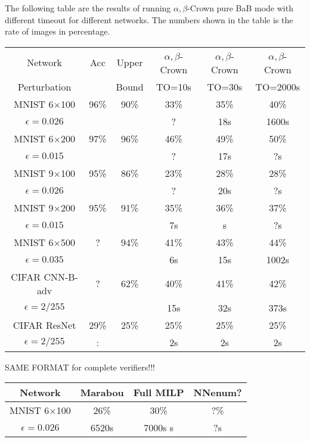 \documentclass{article} %
\theoremstyle{definition}
\begin{document}
The following table are the results of running $\alpha,\beta$-Crown pure BaB mode with different timeout for different networks. The numbers shown in the table is the rate of images in percentage.

\begin{tabular}{||c|c|c||c|c|c||}
	\hline \hline
	Network & Acc & Upper  & $\alpha,\beta$-Crown& $\alpha,\beta$-Crown & $\alpha,\beta$-Crown \\ 
	Perturbation &   & Bound & TO=10s & TO=30s & TO=2000s\\ \hline
	MNIST 6$\times$100 & 96\% & 90\% & 33\% & 35\% & 40\%   \\
	$\epsilon = 0.026$ &  &  & ? &  18s &  1600s  \\  \hline
    MNIST 6$\times$200 & 97\%  & 96\%  & 46\%  & 49\%  & 50\%   \\ 
	$\epsilon = 0.015$ & &  & ? &  17s &  ?s  \\  \hline
	MNIST 9$\times$100 & 95\%  & 86\%  & 23\%  & 28\%  & 28\%   \\
	$\epsilon = 0.026$ &  &  & ? &  20s &  ?s  \\  \hline
	MNIST 9$\times$200 & 95\%  & 91\%  & 35\%  & 36\%  & 37\%   \\ 
	$\epsilon = 0.015$ & &  & 7s &  s &  ?s  \\  \hline
	MNIST 6$\times$500 &  ? & 94\%  & 41\%  & 43\%  & 44\%   \\ 
	$\epsilon = 0.035$ & &  & 6s &  15s &  1002s  \\  \hline
	CIFAR CNN-B-adv & ?  & 62\%  &  40\% & 41\%  & 42\%   \\
	$\epsilon = 2/255$ &  &  & 15s & 32s & 373s  \\ \hline \hline
	CIFAR ResNet & 29\%  & 25\%  & 25\%  & 25\%  & 25\%   \\
	$\epsilon=2/255$ & : &  & 2s & 2s & 2s  \\ \hline \hline
	

\end{tabular}

SAME FORMAT for complete verifiers!!!

\begin{tabular}{||c||c|c|c||}
	\hline
	Network &  Marabou  & Full MILP & NNenum? \\ \hline
	MNIST 6$\times$100 & 26\% & 30\% & ?\%   \\ \hline
	$\epsilon = 0.026$ & 6520s & 7000s s
	 &  ?s  \\  \hline
\end{tabular}
\end{document}
